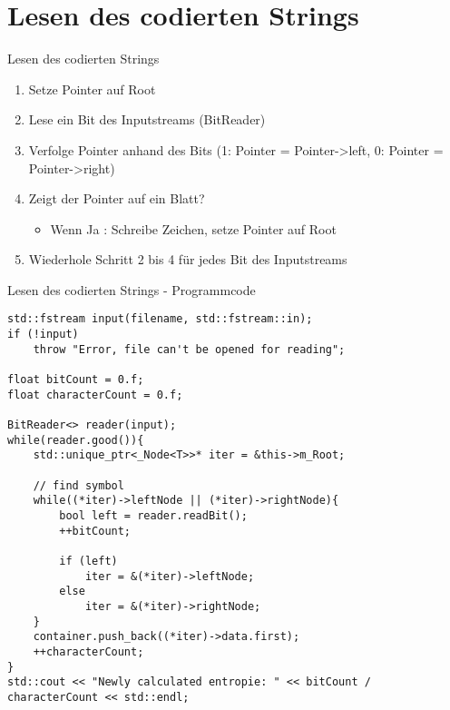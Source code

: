 \documentclass{beamer}
\begin{document}
  
  \section{Lesen des codierten Strings}
  \begin{frame}{Lesen des codierten Strings}
  	\begin{enumerate}
  		\item Setze Pointer auf Root
  		\item Lese ein Bit des Inputstreams (BitReader)
  		\item Verfolge Pointer anhand des Bits \newline (1: Pointer = Pointer->left, 0: Pointer = Pointer->right)
  		\item Zeigt der Pointer auf ein Blatt?
  		\begin{itemize}
  			\item Wenn Ja : Schreibe Zeichen, setze Pointer auf Root
  		\end{itemize}
  		\item Wiederhole Schritt 2 bis 4 für jedes Bit des Inputstreams
  	\end{enumerate}
  \end{frame}
  
  \begin{frame}[fragile]{Lesen des codierten Strings - \newline Programmcode} \label{EntropieLesen}
  	\begin{lstlisting}[style=numbers]
std::fstream input(filename, std::fstream::in);
if (!input)
    throw "Error, file can't be opened for reading";

float bitCount = 0.f;
float characterCount = 0.f;

BitReader<> reader(input);
while(reader.good()){
    std::unique_ptr<_Node<T>>* iter = &this->m_Root;

    // find symbol
    while((*iter)->leftNode || (*iter)->rightNode){
        bool left = reader.readBit();
        ++bitCount;

        if (left)
            iter = &(*iter)->leftNode;
        else
            iter = &(*iter)->rightNode;
    }
    container.push_back((*iter)->data.first);
    ++characterCount;
}
std::cout << "Newly calculated entropie: " << bitCount / characterCount << std::endl;
\end{lstlisting}
\end{frame}  
\end{document}

